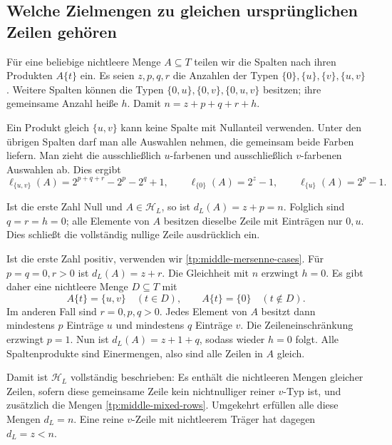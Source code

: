 \documentclass[a4paper,11pt]{article}
\newcommand{\HL}{\mathcal H_L}
\theoremstyle{remark}
\begin{document}
\subsection{Welche Zielmengen zu gleichen ursprünglichen Zeilen gehören}

Für eine beliebige nichtleere Menge \(A\subseteq T\) teilen wir die
Spalten nach ihren Produkten \(A\{t\}\) ein. Es seien \(z,p,q,r\)
die Anzahlen der Typen \(\{0\},\{u\},\{v\},\{u,v\}\).
Weitere Spalten können die Typen \(\{0,u\},\{0,v\},\{0,u,v\}\)
besitzen; ihre gemeinsame Anzahl heiße \(h\). Damit
\(n=z+p+q+r+h\).

Ein Produkt gleich \(\{u,v\}\) kann keine Spalte mit Nullanteil
verwenden. Unter den übrigen Spalten darf man alle Auswahlen nehmen,
die gemeinsam beide Farben liefern. Man zieht die ausschließlich
\(u\)-farbenen und ausschließlich \(v\)-farbenen Auswahlen ab.
Dies ergibt
\begin{equation}
 \ell_{\{u,v\}}(A)=2^{p+q+r}-2^p-2^q+1,\qquad
 \ell_{\{0\}}(A)=2^z-1,\qquad
 \ell_{\{u\}}(A)=2^p-1.
 \label{tp:middle-rectangle-count}
\end{equation}

Ist die erste Zahl Null und \(A\in\HL\), so ist
\(d_L(A)=z+p=n\). Folglich sind \(q=r=h=0\); alle Elemente
von \(A\) besitzen dieselbe Zeile mit Einträgen nur \(0,u\).
Dies schließt die vollständig nullige Zeile ausdrücklich ein.

Ist die erste Zahl positiv, verwenden wir
\eqref{tp:middle-mersenne-cases}. Für \(p=q=0,r>0\) ist
\(d_L(A)=z+r\). Die Gleichheit mit \(n\) erzwingt \(h=0\).
Es gibt daher eine nichtleere Menge \(D\subseteq T\) mit
\begin{equation}
 A\{t\}=\{u,v\}\quad(t\in D),\qquad
 A\{t\}=\{0\}\quad(t\notin D).
 \label{tp:middle-mixed-rows}
\end{equation}
Im anderen Fall sind \(r=0,p,q>0\). Jedes Element von \(A\)
besitzt dann mindestens \(p\) Einträge \(u\) und mindestens
\(q\) Einträge \(v\). Die Zeileneinschränkung erzwingt \(p=1\).
Nun ist \(d_L(A)=z+1+q\), sodass wieder \(h=0\) folgt. Alle
Spaltenprodukte sind Einermengen, also sind alle Zeilen in \(A\)
gleich.

Damit ist \(\HL\) vollständig beschrieben: Es enthält die
nichtleeren Mengen gleicher Zeilen, sofern diese gemeinsame Zeile
kein nichtnulliger reiner \(v\)-Typ ist, und zusätzlich die Mengen
\eqref{tp:middle-mixed-rows}. Umgekehrt erfüllen alle diese Mengen
\(d_L=n\). Eine reine \(v\)-Zeile mit nichtleerem Träger hat
dagegen \(d_L=z<n\).
\end{document}
